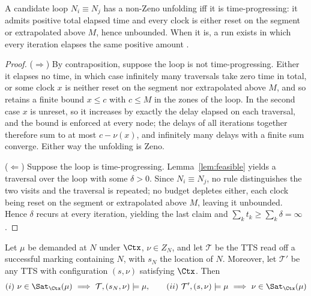 \begin{lemma}\label{lem:nonzeno}
A candidate loop $N_i \equiv N_j$ has a non-Zeno unfolding iff it is {time-progressing}: it admits positive total elapsed time and every clock is either reset on the segment or extrapolated above $M$, hence unbounded.
When it is, a run exists in which every iteration elapses the same positive amount%
.
\end{lemma}
\begin{proof}
($\Rightarrow$) By contraposition, suppose the loop is not time-progressing.  Either it elapses no time, in which case infinitely many traversals take zero
time in total, or some clock $x$ is neither reset on the segment nor extrapolated above $M$,
and so retains a finite bound $x\le c$ with $c\le M$ in the zones of the loop. In the second
case $x$ is unreset, so it increases by exactly the delay elapsed on each traversal, and the
bound is enforced at every node; the delays of all iterations together therefore sum to at most
$c-\nu(x)$, and infinitely many delays with a finite sum converge. Either way the unfolding is
Zeno.

($\Leftarrow$) Suppose the loop is time-progressing. Lemma~\ref{lem:feasible} yields a
traversal over the loop with some $\delta>0$. Since $N_i\equiv N_j$, no rule distinguishes
the two visits and the traversal is repeated; no budget depletes either, each clock being
reset on the segment or extrapolated above $M$, leaving it unbounded. 
Hence $\delta$ recurs at every iteration, yielding the last claim and $\sum_k t_k\ge\sum_k\delta=\infty$.
\end{proof}




\begin{lemma}\label{lem:sat}
Let $\mu$ be demanded at $N$ under $\Ctx$, $\nu\in Z_N$, and let $\mathcal{T}$ be the TTS
read off a successful marking containing $N$, with $s_N$ the location of $N$. Moreover, let $\mathcal{T}'$ be any TTS with configuration $(s,\nu)$ satisfying $\Ctx$. Then
\[
  (i)\ \nu\in\Sat_{\Ctx}(\mu)\ \Longrightarrow\ \mathcal{T},(s_N,\nu)\models\mu,
  \qquad
  (ii)\ \mathcal{T}',(s,\nu)\models\mu\ \Longrightarrow\ \nu\in\Sat_{\Ctx}(\mu)
\]
\end{lemma}




